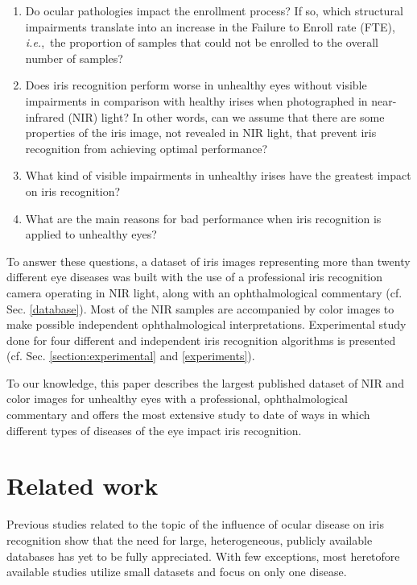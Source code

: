 \documentclass[article,12pt]{elsarticle}
\newcommand{\ie}{{\it i.e.},~}
\begin{document}
\begin{enumerate}
\item Do ocular pathologies impact the enrollment process? If so, which structural impairments translate into an increase in the Failure to Enroll rate (FTE), \ie the proportion of samples that could not be enrolled to the overall number of samples?
\item Does iris recognition perform worse in unhealthy eyes without visible impairments in comparison with healthy irises when photographed in near-infrared (NIR) light? In other words, can we assume that there are some properties of the iris image, not revealed in NIR light, that prevent iris recognition from achieving optimal performance?
\item What kind of visible impairments in unhealthy irises have the greatest impact on iris recognition?
\item What are the main reasons for bad performance when iris recognition is applied to unhealthy eyes?
\end{enumerate}

To answer these questions, a dataset of iris images representing more than twenty different eye diseases was built with the use of a professional iris recognition camera operating in NIR light, along with an ophthalmological commentary (cf. Sec. \ref{database}). Most of the NIR samples are accompanied by color images to make possible independent ophthalmological interpretations. Experimental study done for four different and independent iris recognition algorithms is presented (cf. Sec. \ref{section:experimental} and \ref{experiments}).

To our knowledge, this paper describes the largest published dataset of NIR and color images for unhealthy eyes with a professional, ophthalmological commentary and offers the most extensive study to date of ways in which different types of diseases of the eye impact iris recognition.


\section{Related work}
\label{related}

Previous studies related to the topic of the influence of ocular disease on iris recognition show that the need for large, heterogeneous, publicly available databases has yet to be fully appreciated.  With few exceptions, most heretofore available studies utilize small datasets and focus on only one disease.
\end{document}

